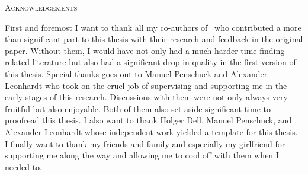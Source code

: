 \newpage
\begin{center}
  \textsc{Acknowledgements}
\end{center}

First and foremost I want to thank all my co-authors of~\cite{RNEW} who contributed a more than significant part to this thesis with their research and feedback in the original paper.
Without them, I would have not only had a much harder time finding related literature but also had a significant drop in quality in the first version of this thesis.
Special thanks goes out to Manuel Penschuck and Alexander Leonhardt who took on the cruel job of supervising and supporting me in the early stages of this research.
Discussions with them were not only always very fruitful but also enjoyable.
Both of them also set aside significant time to proofread this thesis.
I also want to thank Holger Dell, Manuel Penschuck, and Alexander Leonhardt whose independent work yielded a template for this thesis.
I finally want to thank my friends and family and especially my girlfriend for supporting me along the way and allowing me to cool off with them when I needed to.
